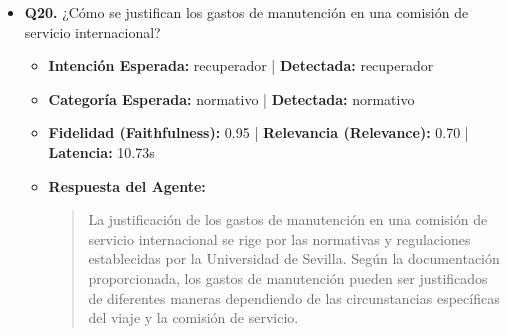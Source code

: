 \documentclass[12pt,a4paper,oneside]{report}
\begin{document}
\begin{itemize}
\begin{itemize}
\begin{quote}
La dieta máxima por alojamiento nacional para el PDI en la Universidad de Sevilla es de \textbf{150,00  } para Madrid / Barcelona y \textbf{130,00  } para el resto del territorio.
                \end{quote}
          \item \textbf{{Ground Truth (Referencia):}} \\
                \begin{quote}
La dieta nacional máxima para alojamiento del Grupo II (donde se encuadra el PDI) está fijada por las tablas del reglamento oficial de comisiones de servicio de la US.
                \end{quote}
          \item \textbf{{Referencias / Fuentes Utilizadas:}} \\
                \begin{itemize}
                  \item Miniguía viajes personal propio US.pdf (Página 2)
                  \item Miniguía viajes personal externo US.pdf (Página 3)
                  \item Miniguía viajes personal propio US.pdf (Página 7)
                  \item guia-completa-liquidacion-de-viajes-v2.pdf (Página 11)
                \end{itemize}
        \end{itemize}

  
\item \textbf{Q20.} ¿Cómo se justifican los gastos de manutención en una comisión de servicio internacional? \\
        \begin{itemize}
          \item \textbf{Intención Esperada:} recuperador | \textbf{Detectada:} recuperador
          \item \textbf{Categoría Esperada:} normativo | \textbf{Detectada:} normativo
          \item \textbf{Fidelidad (Faithfulness):} 0.95 | \textbf{Relevancia (Relevance):} 0.70 | \textbf{Latencia:} 10.73s
          \item \textbf{{Respuesta del Agente:}} \\
                \begin{quote}
La justificación de los gastos de manutención en una comisión de servicio internacional se rige por las normativas y regulaciones establecidas por la Universidad de Sevilla. Según la documentación proporcionada, los gastos de manutención pueden ser justificados de diferentes maneras dependiendo de las circunstancias específicas del viaje y la comisión de servicio.


\end{quote}
\end{itemize}
\end{itemize}
\end{document}
